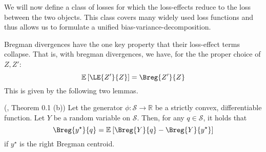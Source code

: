 \documentclass[../main.tex]{subfiles}
\begin{document}

We will now define a class of losses for which the loss-effects reduce to the loss between the two objects. This class covers many widely used loss functions and thus allows us to formulate a unified bias-variance-decomposition. 




Bregman divergences have the one key property that their loss-effect terms collapse. That is, with bregman divergences, we have, for the the proper choice of $Z, Z'$:
$$
\mathbb{E}\left[\LE{Z'}{Z}\right] = \Breg{Z'}{Z}
$$
This is given by the following two lemmas. 

\begin{lemma} \label{thm:bregman-collapse-bias} (\cite{pfau}, Theorem 0.1 (b))
Let the generator $\phi: \mathcal{S} \to \mathbb{R}$ be a strictly convex, differentiable function. Let $Y$ be a random variable on $\mathcal{S}$. Then, for any $q \in \mathcal{S}$, it holds that
$$
\Breg{y^\star}{q} = \mathbb{E}_{}\left[ \Breg{Y}{q}  - \Breg{Y}{y^\star} \right]
$$
if $y^\star$ is the right Bregman centroid.
\end{lemma}
\end{document}
